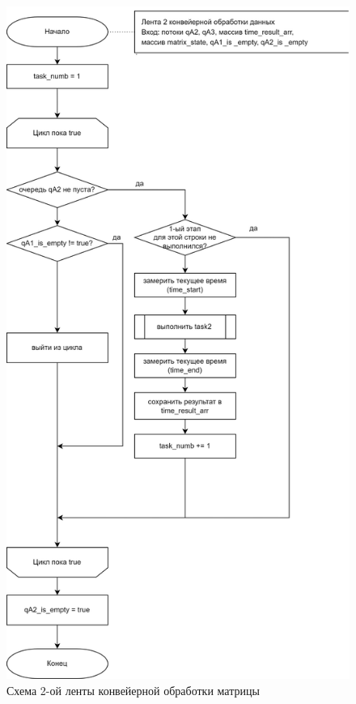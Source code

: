 \begin{figure}[h]
	\centering
	\includegraphics[scale=0.2]{img/parallel_stage_2.png}
	\caption{Схема 2-ой ленты конвейерной обработки матрицы}
	\label{fig:parallel_stage_2}
\end{figure} 

